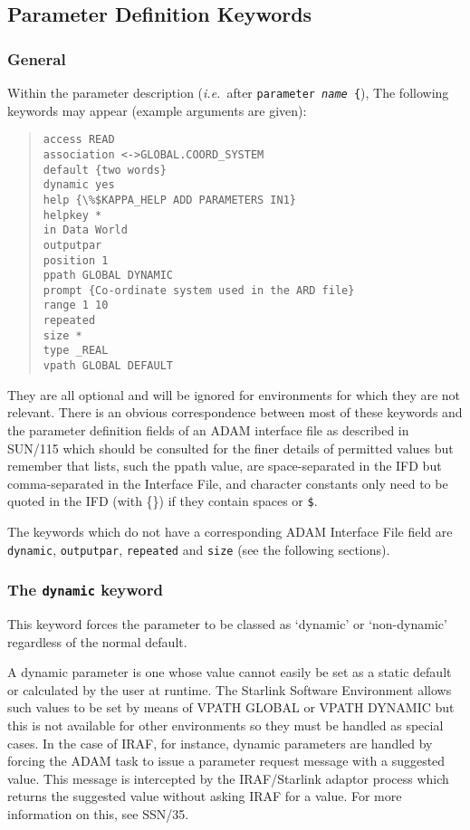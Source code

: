 \documentclass[twoside,11pt]{article}
\newcommand{\htmlref}[2]{#1}
\newcommand{\xref}[3]{#1}
\newcommand{\xlabel}[1]{}
\newcommand{\latex}[1]{#1}
\begin{document}
\subsection{\xlabel{parameter_definition_keywords}Parameter Definition Keywords}
\subsubsection{\xlabel{general}General}
Within the parameter description 
(\textit{i.e.}\ after \texttt{parameter \textit{name} \{}), The following
keywords may appear (example arguments are given):
\begin{quote} \begin{verbatim}
access READ
association <->GLOBAL.COORD_SYSTEM
default {two words}
dynamic yes
help {\%$KAPPA_HELP ADD PARAMETERS IN1}
helpkey *
in Data World
outputpar
position 1
ppath GLOBAL DYNAMIC
prompt {Co-ordinate system used in the ARD file}
range 1 10
repeated
size *
type _REAL
vpath GLOBAL DEFAULT
\end{verbatim} \end{quote}
They are all optional and will be ignored for environments for which they are 
not relevant. There is an obvious correspondence between most of these 
keywords and the parameter definition fields of an ADAM interface file as
described in 
\xref{SUN/115}{sun115}{}
which should be consulted for the finer details of permitted values but
remember that lists, such the ppath value, are space-separated in the IFD but 
comma-separated in the Interface File, and character constants only need to be
quoted in the IFD (with \{\}) if they contain spaces or \texttt{\$}.

The keywords which do not have a corresponding ADAM Interface File field
are
\htmlref{\texttt{dynamic}}{dynamic_key},
\htmlref{\texttt{outputpar}}{outputpar_key},
\htmlref{\texttt{repeated}}{repeated_key}
and
\htmlref{\texttt{size}}{size_key}\latex{ (see the following sections)}.

\subsubsection{\xlabel{the_dynamic_keyword}\label{dynamic_key}The 
\texttt{dynamic} keyword}
This keyword forces the parameter to be classed as `dynamic' or `non-dynamic'
regardless of the normal default. 

A dynamic parameter is one whose value cannot
easily be set as a static default or calculated by the user at runtime. 
The Starlink Software Environment allows such values to be set by means of 
VPATH GLOBAL or VPATH DYNAMIC but this is not available for other environments
so they must be handled as special cases. In the case of IRAF, for instance,
dynamic parameters are handled by forcing the ADAM task to issue a parameter
request message with a suggested value. This message is intercepted by the
\xref{IRAF/Starlink adaptor process}{ssn35}{the_adaptor_process}
which returns the suggested value without asking IRAF for a value.
For more information on this, see
\xref{SSN/35}{ssn35}{dynamic_parameters}.
\end{document}
